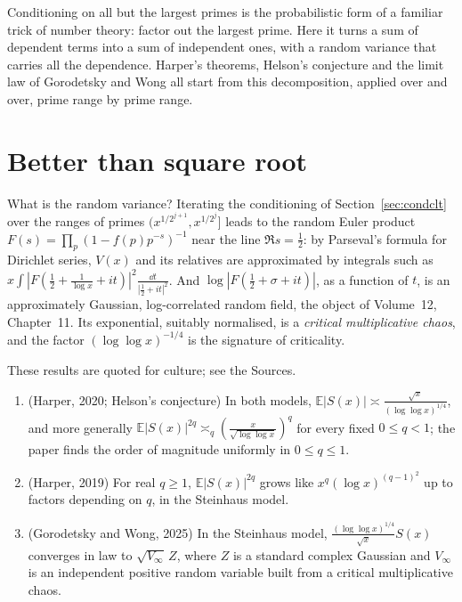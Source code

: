 \begin{beauty}
Conditioning on all but the largest primes is the probabilistic form of a familiar trick of number theory: factor out the largest prime. Here it turns a sum of dependent terms into a sum of independent ones, with a random variance that carries all the dependence. Harper's theorems, Helson's conjecture and the limit law of Gorodetsky and Wong all start from this decomposition, applied over and over, prime range by prime range.
\end{beauty}

\section{Better than square root}\label{sec:betterthan}

What is the random variance? Iterating the conditioning of Section~\ref{sec:condclt} over the ranges of primes $(x^{1/2^{j+1}},x^{1/2^j}]$ leads to the random Euler product $F(s)=\prod_{p}(1-f(p)p^{-s})^{-1}$ near the line $\Re s=\frac12$: by Parseval's formula for Dirichlet series, $V(x)$ and its relatives are approximated by integrals such as $x\int|F(\frac12+\frac1{\log x}+it)|^2\frac{\dd t}{|\frac12+it|^2}$. And $\log|F(\frac12+\sigma+it)|$, as a function of $t$, is an approximately Gaussian, log-correlated random field, the object of Volume~12, Chapter~11. Its exponential, suitably normalised, is a \emph{critical multiplicative chaos}, and the factor $(\log\log x)^{-1/4}$ is the signature of criticality.

\begin{remark}
These results are quoted for culture; see the Sources.
\begin{enumerate}[label=(\alph*)]
\item (Harper, 2020; Helson's conjecture) In both models, $\mathbb E|S(x)|\asymp\frac{\sqrt x}{(\log\log x)^{1/4}}$, and more generally $\mathbb E|S(x)|^{2q}\asymp_q(\frac x{\sqrt{\log\log x}})^q$ for every fixed $0\le q<1$; the paper finds the order of magnitude uniformly in $0\le q\le1$.
\item (Harper, 2019) For real $q\ge1$, $\mathbb E|S(x)|^{2q}$ grows like $x^q(\log x)^{(q-1)^2}$ up to factors depending on $q$, in the Steinhaus model.
\item (Gorodetsky and Wong, 2025) In the Steinhaus model, $\frac{(\log\log x)^{1/4}}{\sqrt x}S(x)$ converges in law to $\sqrt{V_\infty}\,Z$, where $Z$ is a standard complex Gaussian and $V_\infty$ is an independent positive random variable built from a critical multiplicative chaos.
\end{enumerate}
\end{remark}

